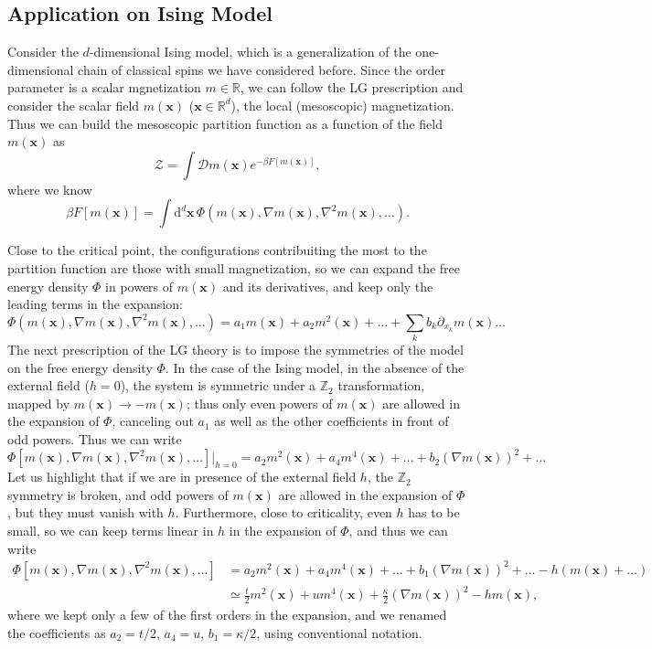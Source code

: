 \subsection{Application on Ising Model}

Consider the \(d\)-dimensional Ising model, which is a generalization of the one-dimensional chain of classical spins we have considered before. Since the order parameter is a scalar mgnetization \(m \in \mathbb{R}\), we can follow the LG prescription and consider the scalar field \(m(\mathbf{x})\) (\(\mathbf{x} \in \mathbb{R}^d\)), the local (mesoscopic) magnetization. Thus we can build the mesoscopic partition function as a function of the field \(m(\mathbf{x})\) as
\[
    \mathcal{Z} = \int \mathcal{D} m(\mathbf{x}) e^{-\beta F[m(\mathbf{x})]},
\]
where we know
\[
    \beta F[m(\mathbf{x})] = \int \mathrm{d}^d \mathbf{x}\, \Phi(m(\mathbf{x}), \nabla m(\mathbf{x}), \nabla^2 m(\mathbf{x}), \dots).
\]

Close to the critical point, the configurations contribuiting the most to the partition function are those with small magnetization, so we can expand the free energy density \(\Phi\) in powers of \(m(\mathbf{x})\) and its derivatives, and keep only the leading terms in the expansion:
\[
    \Phi(m(\mathbf{x}), \nabla m(\mathbf{x}), \nabla^2 m(\mathbf{x}), \dots) = a_1 m(\mathbf{x}) + a_2 m^2(\mathbf{x}) + \dots + \sum_{k} b_k \partial_{x_k} m(\mathbf{x}) \dots
\]
The next prescription of the LG theory is to impose the symmetries of the model on the free energy density \(\Phi\). In the case of the Ising model, in the absence of the external field (\(h=0\)), the system is symmetric under a \(\mathbb{Z}_2\) transformation, mapped by \(m(\mathbf{x}) \to -m(\mathbf{x})\); thus only even powers of \(m(\mathbf{x})\) are allowed in the expansion of \(\Phi\), canceling out \(a_1\) as well as the other coefficients in front of odd powers. Thus we can write
\[
    \Phi [m(\mathbf{x}), \nabla m(\mathbf{x}), \nabla^2 m(\mathbf{x}), \dots] \big|_{h=0} = a_2 m^2(\mathbf{x}) + a_4 m^4(\mathbf{x}) + \dots + b_2 (\nabla m(\mathbf{x}))^2 + \dots
\]
Let us highlight that if we are in presence of the external field \(h\), the \(\mathbb{Z}_2\) symmetry is broken, and odd powers of \(m(\mathbf{x})\) are allowed in the expansion of \(\Phi\), but they must vanish with \(h\). Furthermore, close to criticality, even \(h\) has to be small, so we can keep terms linear in \(h\) in the expansion of \(\Phi\), and thus we can write
\[
    \begin{aligned}
        \Phi [m(\mathbf{x}), \nabla m(\mathbf{x}), \nabla^2 m(\mathbf{x}), \dots] & = a_2 m^2(\mathbf{x}) + a_4 m^4(\mathbf{x}) + \dots + b_1 (\nabla m(\mathbf{x}))^2 + \dots - h (m(\mathbf{x}) + \dots) \\
                                                                                  & \simeq \frac{t}{2} m^2(\mathbf{x}) + u m^4(\mathbf{x}) + \frac{\kappa}{2} (\nabla m(\mathbf{x}))^2 - h m(\mathbf{x}),
    \end{aligned}
\]
where we kept only a few of the first orders in the expansion, and we renamed the coefficients as \(a_2 = t/2\), \(a_4 = u\), \(b_1 = \kappa/2\), using conventional notation.

